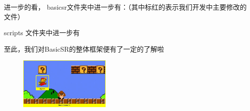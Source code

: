 \documentclass[../main.tex]{subfiles}
\begin{document}
进一步的看，
basicsr文件夹中进一步有：（其中标红的表示我们开发中主要修改的文件）


scripts 文件夹中进一步有

至此，我们对BasicSR的整体框架便有了一定的了解啦~





\begin{figure}
\centering
\includegraphics[width=0.4\textwidth]{figures/agentenv.png}
\end{figure}
\end{document}
